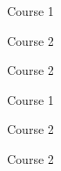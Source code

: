 

\begin{cvcourses}
  
        \cvcourse
      
        {Course 1}
        
        {Course 2}
        
        {Course 2}
        
      
  
        \cvcourse
      
        {Course 1}
        
        {Course 2}
        
        {Course 2}
        
      
  
\end{cvcourses}


